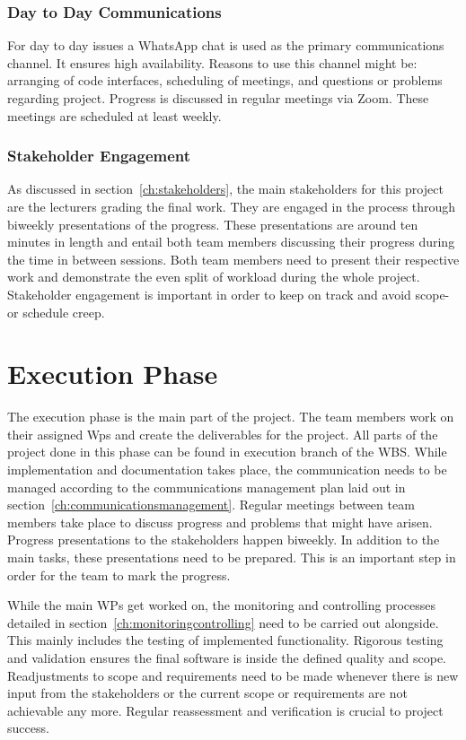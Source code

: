 \subsubsection{Day to Day Communications}
\label{ch:daytodaycomms}
For day to day issues a WhatsApp chat is used as the primary communications channel. It ensures high availability. Reasons to use this channel might be: arranging of code interfaces, scheduling of meetings, and questions or problems regarding project. Progress is discussed in regular meetings via Zoom. These meetings are scheduled at least weekly.


\subsubsection{Stakeholder Engagement}
\label{ch:stakeholerengagement}
As discussed in section~\ref{ch:stakeholders}, the main stakeholders for this project are the lecturers grading the final work. They are engaged in the process through biweekly presentations of the progress. These presentations are around ten minutes in length and entail both team members discussing their progress during the time in between sessions. Both team members need to present their respective work and demonstrate the even split of workload during the whole project. Stakeholder engagement is important in order to keep on track and avoid scope- or schedule creep.


\section{Execution Phase}
\label{ch:executionphase}
The execution phase is the main part of the project. The team members work on their assigned \ac{Wp}s and create the deliverables for the project. All parts of the project done in this phase can be found in execution branch of the \ac{WBS}. While implementation and documentation takes place, the communication needs to be managed according to the communications management plan laid out in section~\ref{ch:communicationsmanagement}. Regular meetings between team members take place to discuss progress and problems that might have arisen. Progress presentations to the stakeholders happen biweekly. In addition to the main tasks, these presentations need to be prepared. This is an important step in order for the team to mark the progress.

While the main \ac{WP}s get worked on, the monitoring and controlling processes detailed in section~\ref{ch:monitoringcontrolling} need to be carried out alongside. This mainly includes the testing of implemented functionality. Rigorous testing and validation ensures the final software is inside the defined quality and scope. Readjustments to scope and requirements need to be made whenever there is new input from the stakeholders or the current scope or requirements are not achievable any more. Regular reassessment and verification is crucial to project success.



